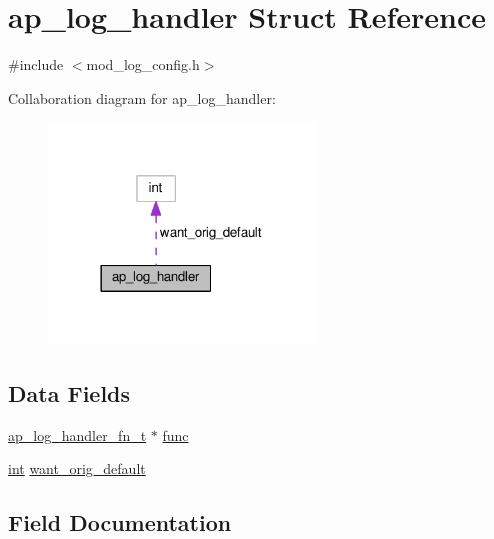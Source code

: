 \hypertarget{structap__log__handler}{}\section{ap\+\_\+log\+\_\+handler Struct Reference}
\label{structap__log__handler}


{\ttfamily \#include $<$mod\+\_\+log\+\_\+config.\+h$>$}



Collaboration diagram for ap\+\_\+log\+\_\+handler\+:
\nopagebreak
\begin{figure}[H]
\begin{center}
\leavevmode
\includegraphics[width=201pt]{structap__log__handler__coll__graph}
\end{center}
\end{figure}
\subsection*{Data Fields}
\begin{DoxyCompactItemize}
\item 
\hyperlink{group__MOD__LOG__CONFIG_ga8b3bfba0c0ad4bfc84f9c730478a38ed}{ap\+\_\+log\+\_\+handler\+\_\+fn\+\_\+t} $\ast$ \hyperlink{structap__log__handler_aabb0ef7d2d118585ec6cceabe90ccf7e}{func}
\item 
\hyperlink{pcre_8txt_a42dfa4ff673c82d8efe7144098fbc198}{int} \hyperlink{structap__log__handler_a37ebbaa820e7a49d279fc8419293285f}{want\+\_\+orig\+\_\+default}
\end{DoxyCompactItemize}


\subsection{Field Documentation}
